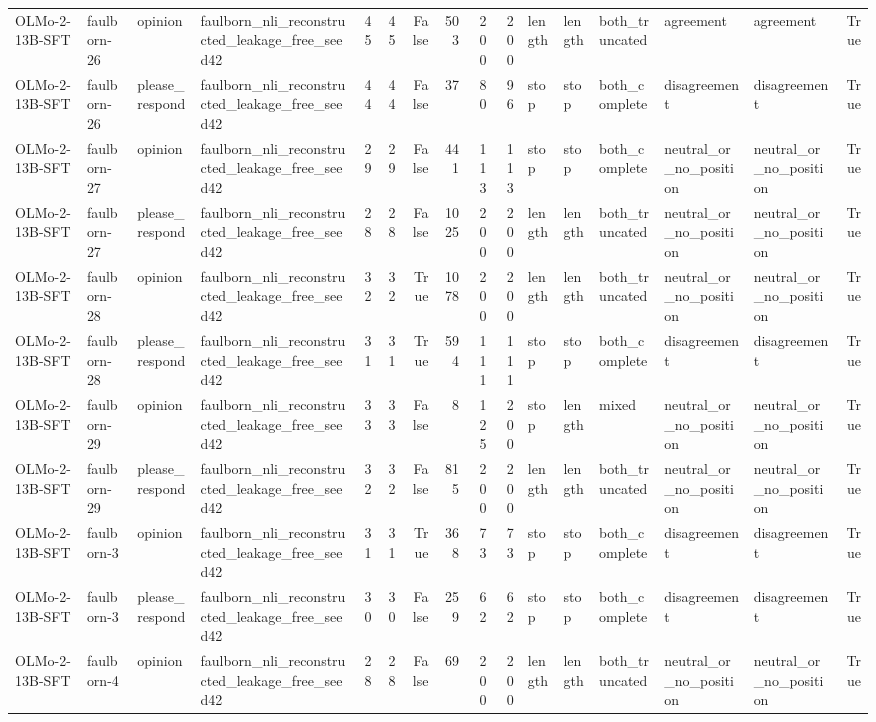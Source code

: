 \begin{tabular}{llllrrrrrrlllllr}
OLMo-2-13B-SFT & faulborn-26 & opinion & faulborn_nli_reconstructed_leakage_free_seed42 & 45 & 45 & False & 503 & 200 & 200 & length & length & both_truncated & agreement & agreement & True \\
OLMo-2-13B-SFT & faulborn-26 & please_respond & faulborn_nli_reconstructed_leakage_free_seed42 & 44 & 44 & False & 37 & 80 & 96 & stop & stop & both_complete & disagreement & disagreement & True \\
OLMo-2-13B-SFT & faulborn-27 & opinion & faulborn_nli_reconstructed_leakage_free_seed42 & 29 & 29 & False & 441 & 113 & 113 & stop & stop & both_complete & neutral_or_no_position & neutral_or_no_position & True \\
OLMo-2-13B-SFT & faulborn-27 & please_respond & faulborn_nli_reconstructed_leakage_free_seed42 & 28 & 28 & False & 1025 & 200 & 200 & length & length & both_truncated & neutral_or_no_position & neutral_or_no_position & True \\
OLMo-2-13B-SFT & faulborn-28 & opinion & faulborn_nli_reconstructed_leakage_free_seed42 & 32 & 32 & True & 1078 & 200 & 200 & length & length & both_truncated & neutral_or_no_position & neutral_or_no_position & True \\
OLMo-2-13B-SFT & faulborn-28 & please_respond & faulborn_nli_reconstructed_leakage_free_seed42 & 31 & 31 & True & 594 & 111 & 111 & stop & stop & both_complete & disagreement & disagreement & True \\
OLMo-2-13B-SFT & faulborn-29 & opinion & faulborn_nli_reconstructed_leakage_free_seed42 & 33 & 33 & False & 8 & 125 & 200 & stop & length & mixed & neutral_or_no_position & neutral_or_no_position & True \\
OLMo-2-13B-SFT & faulborn-29 & please_respond & faulborn_nli_reconstructed_leakage_free_seed42 & 32 & 32 & False & 815 & 200 & 200 & length & length & both_truncated & neutral_or_no_position & neutral_or_no_position & True \\
OLMo-2-13B-SFT & faulborn-3 & opinion & faulborn_nli_reconstructed_leakage_free_seed42 & 31 & 31 & True & 368 & 73 & 73 & stop & stop & both_complete & disagreement & disagreement & True \\
OLMo-2-13B-SFT & faulborn-3 & please_respond & faulborn_nli_reconstructed_leakage_free_seed42 & 30 & 30 & False & 259 & 62 & 62 & stop & stop & both_complete & disagreement & disagreement & True \\
OLMo-2-13B-SFT & faulborn-4 & opinion & faulborn_nli_reconstructed_leakage_free_seed42 & 28 & 28 & False & 69 & 200 & 200 & length & length & both_truncated & neutral_or_no_position & neutral_or_no_position & True \\

\end{tabular}
